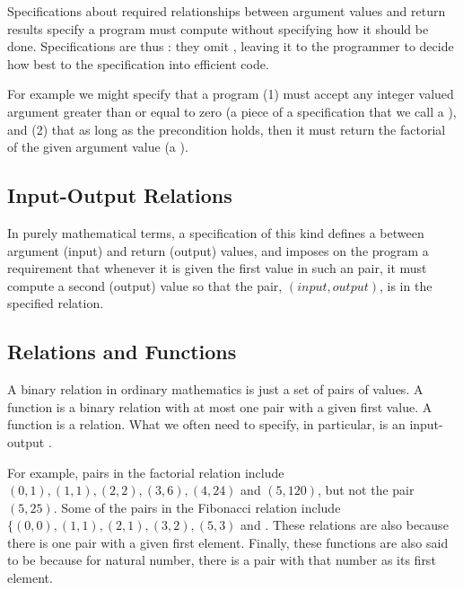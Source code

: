 \documentclass[letterpaper,10pt,english]{sphinxmanual}
\begin{document}
Specifications about required relationships between argument values
and return results specify  a program must compute without
specifying how it should be done. Specifications are thus :
they omit , leaving it to the programmer to
decide how best to  the specification into efficient code.

For example we might specify that a program (1) must accept any
integer valued argument greater than or equal to zero (a piece of a
specification that we call a ), and (2) that as long as
the precondition holds, then it must return the factorial of the given
argument value (a ).


\subsection{Input-Output Relations}
\label{\detokenize{05-putting-it-together:input-output-relations}}
In purely mathematical terms, a specification of this kind defines a
 between argument (input) and return (output) values,
and imposes on the program a requirement that whenever it is given the
first value in such an  pair, it must compute a second
(output) value so that the pair, \((input, output)\), is in the
specified relation.


\subsection{Relations and Functions}
\label{\detokenize{05-putting-it-together:relations-and-functions}}
A binary relation in ordinary mathematics is just a set of pairs of
values. A function is a binary relation with at most one pair with a
given first value. A function is a  relation. What we
often need to specify, in particular, is an input-output .

For example, pairs in the factorial relation include \((0,1),
(1,1), (2,2), (3,6), (4,24)\) and \((5,120)\), but not the pair
\((5,25)\). Some of the pairs in the Fibonacci relation include
\(\{ (0,0), (1,1), (2,1), (3,2), (5,3)\) and . These
relations are also  because there is  one pair
with a given first element. Finally, these functions are also said to
be  because for  natural number, there is a pair with
that number as its first element.
\end{document}
